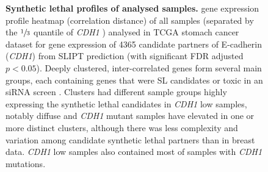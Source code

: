 \begin{figure}[!ht]
  \centering
    \caption[Synthetic lethal  profiles of stomach samples]{\small \textbf{Synthetic lethal  profiles of analysed samples.} \Gls{gene expression} profile heatmap (correlation distance) of all samples (separated by the $\sfrac{1}{3}$ quantile of \textit{CDH1} ) analysed in \gls{TCGA} stomach cancer dataset for \gls{gene expression} of 4365 candidate partners of \gls{E-cadherin} (\textit{CDH1}) from \gls{SLIPT} prediction (with significant \gls{FDR} adjusted $p < 0.05$). Deeply clustered, inter-correlated genes form several main groups, each containing genes that were SL candidates or toxic in an \gls{siRNA} screen \cite{Telford2015}. Clusters had different sample groups highly expressing the \gls{synthetic lethal} candidates in \textit{CDH1} low samples, notably diffuse and \textit{CDH1} \gls{mutant} samples have elevated  in one or more distinct clusters, although there was less complexity and variation among candidate \gls{synthetic lethal} partners than in breast data. \textit{CDH1} low samples also contained most of samples with \textit{CDH1} \glspl{mutation}.
}
\label{fig:slipt_expr_stad}
\end{figure}

